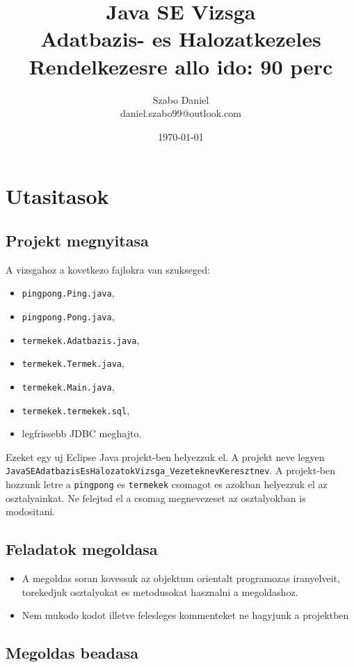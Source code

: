 \documentclass{article}
\title{%
Java SE Vizsga\\
\large Adatbazis- es Halozatkezeles\\
\large Rendelkezesre allo ido: 90 perc}
\author{Szabo Daniel\\daniel.szabo99@outlook.com}
\date{\today}
\let\l\lstinline
\begin{document}
    \maketitle

    \section{Utasitasok}

    \subsection{Projekt megnyitasa}

    A vizsgahoz a kovetkezo fajlokra van szukseged:
    \begin{itemize}
        \item \l{pingpong.Ping.java},
        \item \l{pingpong.Pong.java},
        \item \l{termekek.Adatbazis.java},
        \item \l{termekek.Termek.java},
        \item \l{termekek.Main.java},
        \item \l{termekek.termekek.sql},
        \item legfrissebb JDBC meghajto.
    \end{itemize}
    Ezeket egy uj Eclipse Java projekt-ben helyezzuk el. A projekt neve legyen \l{JavaSEAdatbazisEsHalozatokVizsga_VezeteknevKeresztnev}. A projekt-ben hozzunk letre a \l{pingpong} es \l{termekek} csomagot es azokban helyezzuk el az osztalyainkat. Ne felejtsd el a csomag megnevezeset az osztalyokban is modositani.

    \subsection{Feladatok megoldasa}

    \begin{itemize}
        \item A megoldas soran kovessuk az objektum orientalt programozas iranyelveit, torekedjuk osztalyokat es metodusokat hasznalni a megoldashoz.
        \item Nem mukodo kodot illetve felesleges kommenteket ne hagyjunk a projektben
    \end{itemize}

    \subsection{Megoldas beadasa}
\end{document}
